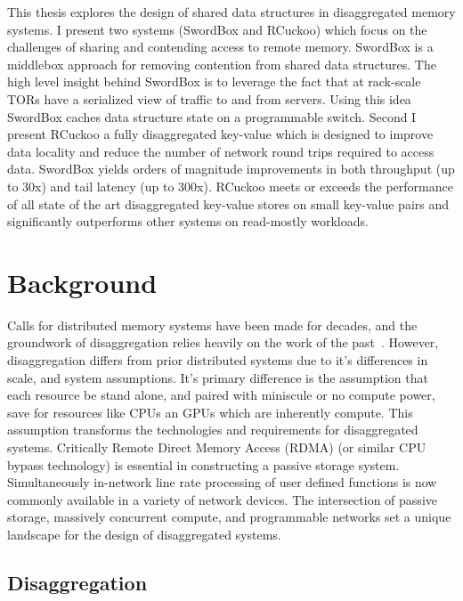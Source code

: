 \documentclass[12pt]{ucsddissertation}
\newcommand{\sword}{SwordBox}
\begin{document}
\begin{dissertationintroduction}
This thesis explores the design of shared data structures in disaggregated memory systems.  I
present two systems ({\sword} and RCuckoo) which focus on the challenges of sharing and contending
access to remote memory. {\sword} is a middlebox approach for removing contention from shared data
structures. The high level insight behind {\sword} is to leverage the fact that at rack-scale TORs
have a serialized view of traffic to and from servers. Using this idea {\sword} caches data
structure state on a programmable switch. Second I present RCuckoo a fully disaggregated key-value
which is designed to improve data locality and reduce the number of network round trips required to
access data. {\sword} yields orders of magnitude improvements in both throughput (up to 30x) and
tail latency (up to 300x).  RCuckoo meets or exceeds the performance of all state of the art
disaggregated key-value stores on small key-value pairs and significantly outperforms other systems
on read-mostly workloads.

\end{dissertationintroduction}

\chapter{Background}

Calls for distributed memory systems have been made for decades, and the groundwork of
disaggregation relies heavily on the work of the past~\cite{treadmarks,gms}. However, disaggregation
differs from prior distributed systems due to it's differences in scale, and system assumptions.
It's primary difference is the assumption that each resource be stand alone, and paired with
miniscule or no compute power, save for resources like CPUs an GPUs which are inherently compute.
This assumption transforms the technologies and requirements for disaggregated systems. Critically
Remote Direct Memory Access (RDMA) (or similar CPU bypass technology) is essential in constructing a
passive storage system. Simultaneously in-network line rate processing of user defined functions is
now commonly available in a variety of network devices. The intersection of passive storage,
massively concurrent compute, and programmable networks set a unique landscape for the design of
disaggregated systems.

\section{Disaggregation}
\end{document}
